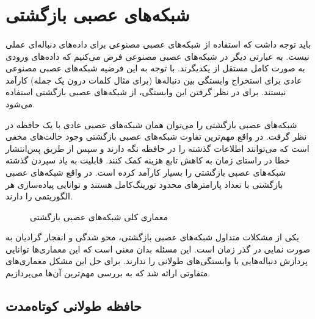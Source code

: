 \section{شبکه‌های عصبی بازگشتی}
\label{sec:rnn}
\paragraph{}
{
    باید توجه داشت که استفاده از شبکه‌های عصبی مصنوعی برای داده‌های دنباله‌ای عملی
    نیست. به عبارتی دیگر در شبکه‌های عصبی مصنوعی فرض می‌کنیم که داده‌های ورودی به صورت
    کامل مستقل از یکدیگرند. با توجه به این فرضیه شبکه‌های عصبی مصنوعی عادی برای 
    استخراج وابستگی بین دنباله‌ها 
    (برای مثال کلمات درون یک جمله)
    کارآمد نیستند. برای در نظر گرفتن این وابستگی، از شبکه‌های عصبی بازگشتی استفاده
    می‌شود. 

    شبکه‌های عصبی بازگشتی را می‌توان همان شبکه‌های عصبی عادی با یک حافظه در نظر گرفت.
    در واقع مهم‌ترین تفاوت شبکه‌های عصبی بازگشتی وجود حالت‌های مخفی است که می‌توانند 
    اطلاعات گذشته را در حافظه نگه دارند و سپس از طریق پس‌انتشار خطا در راستای زمان 
    به کاهش تابع هزینه کمک کنند. قابلیت به یاد سپردن گذشته شبکه‌های عصبی بازگشتی را
    بسیار کارآمد کرده است. در واقع شبکه‌های عصبی بازگشتی با تعداد پارامترهای محدود
    تورینگ‌‌کامل هستند و توانایی پیاده‌سازی هر الگوریتمی را دارند. 
    \cite{sontag1995computational}

    \begin{figure}[H]
     \caption{معماری کلی شبکه‌های عصبی بازگشتی}
     \label{fig:rnn_1}
    \end{figure}

    یکی از مشکلات متداول شبکه‌های عصبی بازگشتی، محو شدگی و انفجار گرادیان
    به صورت نمایی در گذر زمان است. این مسئله بدان معنی است که این معماری‌ها 
    توانایی پردازش دنباله‌هایی با وابستگی‌های طولانی را ندارند. برای حل این‌ مشکل
    معماری‌های متفاوتی ارائه شد که به بررسی مهم‌ترین آن‌ها می‌پردازیم. 
}

\subsection{
    حافظه طولانی کوتا‌ه‌مدت
}
\label{subsec:lstm}
